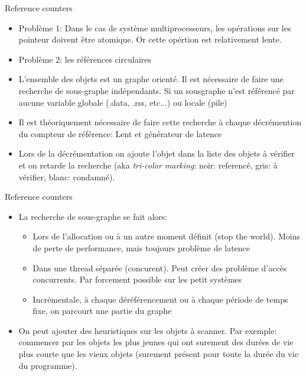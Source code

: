 \begin{frame}[fragile=singleslide]{Reference counters}
  \begin{itemize} 
  \item  Problème 1:  Dans  le cas  de  système multiprocesseurs,  les
    opérations  sur  les pointeur  doivent  être  atomique.  Or  cette
    opértion est relativement lente.
  \item Problème 2: les références circulaires
  \item L'ensemble des objets est un graphe orienté. Il est nécessaire
    de  faire  une  recherche  de  sous-graphe  indépendants.   Si  un
    sousgraphe  n'est référencé  par aucune  variable  globale (.data,
    .rss, etc...) ou locale (pile)
  \item  Il est théoriquement  nécessaire de  faire cette  recherche à
    chaque décrémention  du compteur de référence:  Lent et générateur
    de latence
  \item Lors de la décrémentation  on ajoute l'objet dans la liste des
    objets à vérifier et  on retarde la recherche (aka \emph{tri-color
      marking}: noir: referencé, gris: à vérifier, blanc: condamné).
  \end{itemize}
\end{frame}

\begin{frame}[fragile=singleslide]{Reference counters}
  \begin{itemize} 
  \item La recherche de sous-graphe se fait alors:
    \begin{itemize} 
    \item Lors de l'allocation ou  à un autre moment définit (stop the
      world). Moins de perte de performance, mais toujours problème de
      latence
    \item  Dans  une  thread  séparée  (concurent).   Peut  créer  des
      problème  d'accès concurrents.  Par  forcement possible  sur les
      petit systèmes
    \item Incrémentale,  à chaque déréférencement ou  à chaque période
      de temps fixe, on parcourt une partie du graphe
    \end{itemize}
  \item On peut ajouter des heuristiques sur les objets à scanner. Par
    exemple: commencer par les objets les plus jeunes qui ont surement
    des  durées de  vie plus  courte  que les  vieux objets  (surement
    présent pour toute la durée du vie du programme).
  \end{itemize}
\end{frame} 


